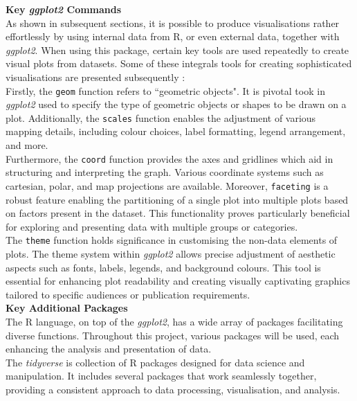 \documentclass{article}\usepackage[]{graphicx}\usepackage[]{xcolor}
\numberwithin{equation}{section}
\begin{document}
\noindent\textbf{Key \textit{ggplot2} Commands}\\
\noindent 
As shown in subsequent sections, it is possible to produce visualisations rather effortlessly by using internal data from R, or even external data, together with \textit{ggplot2}. When using this package, certain key tools are used repeatedly to create visual plots from datasets. Some of these integrals tools for creating sophisticated visualisations are presented subsequently \cite{ggplot2}:\\

\noindent
Firstly, the \texttt{geom} function refers to ``geometric objects". It is pivotal took in \textit{ggplot2} used to specify the type of geometric objects or shapes to be drawn on a plot. Additionally, the \texttt{scales} function enables the adjustment of various mapping details, including colour choices, label formatting, legend arrangement, and more.\\

\noindent Furthermore, the \texttt{coord} function provides the axes and gridlines which aid in structuring and interpreting the graph. Various coordinate systems such as cartesian, polar, and map projections are available. Moreover, \texttt{faceting} is a robust feature enabling the partitioning of a single plot into multiple plots based on factors present in the dataset. This functionality proves particularly beneficial for exploring and presenting data with multiple groups or categories.\\

\noindent The \texttt{theme} function holds significance in customising the non-data elements of plots. The theme system within \textit{ggplot2} allows precise adjustment of aesthetic aspects such as fonts, labels, legends, and background colours. This tool is essential for enhancing plot readability and creating visually captivating graphics tailored to specific audiences or publication requirements.\\

\noindent \textbf{Key Additional Packages}\\

\noindent The R language, on top of the \textit{ggplot2}, has a wide array of packages facilitating diverse functions. Throughout this project, various packages will be used, each enhancing the analysis and presentation of data.\\

\noindent The \textit{tidyverse} is  collection of R packages designed for data science and manipulation. It includes several packages that work seamlessly together, providing a consistent approach to data processing, visualisation, and analysis.\\
\end{document}
